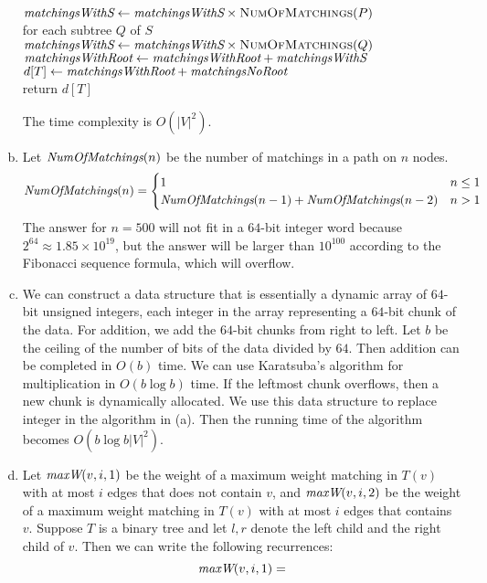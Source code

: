\documentclass[11pt]{article}
\begin{document}
\begin{solution}
\begin{enumerate}[(a)]
\begin{algo}
\\	$\emph{matchingsWithS}\gets \emph{matchingsWithS}\times \textsc{NumOfMatchings}(P)$\-
\\	for each subtree $Q$ of $S$\+
\\	$\emph{matchingsWithS}\gets \emph{matchingsWithS}\times \textsc{NumOfMatchings}(Q)$\-
\\	$\emph{matchingsWithRoot}\gets \emph{matchingsWithRoot} + \emph{matchingsWithS}$\-
\\	$d[T]\gets \emph{matchingsWithRoot}+\emph{matchingsNoRoot}$
\\	return $d[T]$\-
\end{algo}
The time complexity is $O(|V|^2)$.
\item Let $\emph{NumOfMatchings}(n)$ be the number of matchings in a path on $n$ nodes.\
\begin{equation*}
\emph{NumOfMatchings}(n)=
\begin{cases}
1 &n\le 1\\
\emph{NumOfMatchings}(n-1)+\emph{NumOfMatchings}(n-2) &n>1
\end{cases}
\end{equation*}
The answer for $n=500$ will not fit in a $64$-bit integer word because $2^{64}\approx 1.85\times 10^{19}$, but the answer will be larger than $10^{100}$ according to the Fibonacci sequence formula, which will overflow.
\item We can construct a data structure that is essentially a dynamic array of $64$-bit unsigned integers, each integer in the array representing a $64$-bit chunk of the data. For addition, we add the $64$-bit chunks from right to left. Let $b$ be the ceiling of the number of bits of the data divided by $64$. Then addition can be completed in $O(b)$ time. We can use Karatsuba's algorithm for multiplication in $O(b\log{b})$ time. If the leftmost chunk overflows, then a new chunk is dynamically allocated. We use this data structure to replace integer in the algorithm in (a). Then the running time of the algorithm becomes $O(b\log{b}|V|^2)$.
\item Let $\emph{maxW}(v, i, 1)$ be the weight of a maximum weight matching in $T(v)$ with at most $i$ edges that does not contain $v$, and $\emph{maxW}(v, i, 2)$ be the weight of a maximum weight matching in $T(v)$ with at most $i$ edges that contains $v$. Suppose $T$ is a binary tree and let $l,r$ denote the left child and the right child of $v$. Then we can write the following recurrences:
\begin{equation*}
\emph{maxW}(v, i, 1)=

\end{equation*}
\end{enumerate}
\end{solution}
\end{document}
